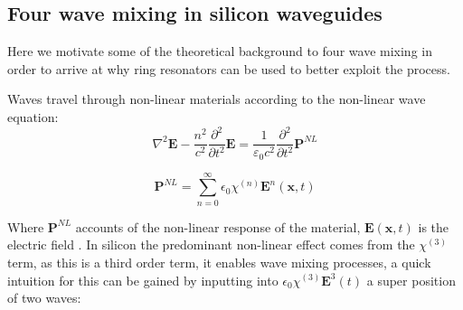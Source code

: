 
\subsection{Four wave mixing in silicon waveguides}
Here we motivate some of the theoretical background to four wave mixing in order to arrive at why ring resonators can be used to better exploit the process. 

Waves travel through non-linear materials according to the non-linear wave equation:
\begin{equation}
\nabla^2 \mathbf{E} - \frac{n^2}{c^2}\frac{\partial^2}{\partial t^2}\mathbf{E}
= \frac{1}{\varepsilon_0 c^2}\frac{\partial^2}{\partial t^2}\mathbf{P}^{NL}
\end{equation}

\begin{equation} \label{polEqn}
\mathbf{P}^{NL} =\sum^\infty_{n=0} \epsilon_0\chi^{(n)}\mathbf{E}^n(\mathbf{x	},t)
\end{equation}

Where $\mathbf{P}^{NL}$ accounts of the non-linear response of the material, $\mathbf{E}(\mathbf{x},t)$ is the electric field . In silicon the predominant non-linear effect comes from the $\chi^{(3)}$ term, as this is a third order term, it enables wave mixing processes, a quick intuition for this can be gained by inputting into $ \epsilon_0\chi^{(3)}\mathbf{E}^3(t)$ a super position of two waves:


